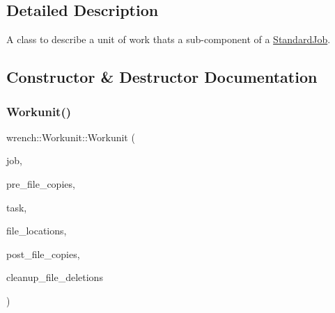 \subsection{Detailed Description}
A class to describe a unit of work that\textquotesingle{}s a sub-\/component of a \hyperlink{classwrench_1_1_standard_job}{Standard\+Job}. 

\subsection{Constructor \& Destructor Documentation}
\mbox{\label{classwrench_1_1_workunit_a91afa9973889dd717d7ee6428ce8d697}} 
\subsubsection{\texorpdfstring{Workunit()}{Workunit()}}
{\footnotesize\ttfamily wrench\+::\+Workunit\+::\+Workunit (\begin{DoxyParamCaption}\item[{\hyperlink{classwrench_1_1_standard_job}{Standard\+Job} $\ast$}]{job,  }\item[{std\+::set$<$ std\+::tuple$<$ \hyperlink{classwrench_1_1_workflow_file}{Workflow\+File} $\ast$, \hyperlink{classwrench_1_1_storage_service}{Storage\+Service} $\ast$, \hyperlink{classwrench_1_1_storage_service}{Storage\+Service} $\ast$$>$$>$}]{pre\+\_\+file\+\_\+copies,  }\item[{\hyperlink{classwrench_1_1_workflow_task}{Workflow\+Task} $\ast$}]{task,  }\item[{std\+::map$<$ \hyperlink{classwrench_1_1_workflow_file}{Workflow\+File} $\ast$, \hyperlink{classwrench_1_1_storage_service}{Storage\+Service} $\ast$$>$}]{file\+\_\+locations,  }\item[{std\+::set$<$ std\+::tuple$<$ \hyperlink{classwrench_1_1_workflow_file}{Workflow\+File} $\ast$, \hyperlink{classwrench_1_1_storage_service}{Storage\+Service} $\ast$, \hyperlink{classwrench_1_1_storage_service}{Storage\+Service} $\ast$$>$$>$}]{post\+\_\+file\+\_\+copies,  }\item[{std\+::set$<$ std\+::tuple$<$ \hyperlink{classwrench_1_1_workflow_file}{Workflow\+File} $\ast$, \hyperlink{classwrench_1_1_storage_service}{Storage\+Service} $\ast$$>$$>$}]{cleanup\+\_\+file\+\_\+deletions }\end{DoxyParamCaption})}



